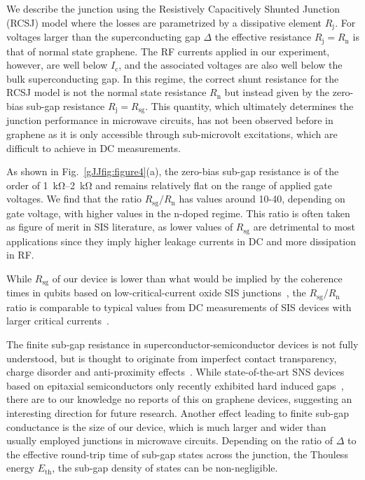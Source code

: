 We describe the junction using the Resistively Capacitively Shunted Junction (RCSJ) model where the losses are parametrized by a dissipative element $R_\text{j}$.
For voltages larger than the superconducting gap $\Delta$ the effective resistance $R_\text{j} = R_\text{n}$ is that of normal state graphene.
The RF currents applied in our experiment, however, are well below $I_\text{c}$, and the associated voltages are also well below the bulk superconducting gap.
In this regime, the correct shunt resistance for the RCSJ model is not the normal state resistance $R_\text{n}$ but instead given by the zero-bias sub-gap resistance $R_\text{j} = R_\text{sg}$.
This quantity, which ultimately determines the junction performance in microwave circuits, has not been observed before in graphene as it is only accessible through sub-microvolt excitations, which are difficult to achieve in DC measurements.

As shown in Fig.~\ref{gJJfig:figure4}(a), the zero-bias sub-gap resistance is of the order of \SIrange{1}{2}{\kilo\ohm} and remains relatively flat on the range of applied gate voltages.
We find that the ratio $R_\text{sg}/R_\text{n}$ has values around 10-40, depending on gate voltage, with higher values in the n-doped regime.
This ratio is often taken as figure of merit in SIS literature, as lower values of $R_\text{sg}$ are detrimental to most applications since they imply higher leakage currents in DC and more dissipation in RF.

While $R_\text{sg}$ of our device is lower than what would be implied by the coherence times in qubits based on low-critical-current oxide SIS junctions~\cite{paikObservationHighCoherence2011g}, the $R_\text{sg}/R_\text{n}$ ratio is comparable to typical values from DC measurements of SIS devices with larger critical currents~\cite{iosadCharacterizationFabricationProcess2002b,tolpygoSubgapLeakageNb2013}.

The finite sub-gap resistance in superconductor-semiconductor devices is not fully understood, but is thought to originate from imperfect contact transparency, charge disorder and anti-proximity effects~\cite{liuPhenomenologySoftGap2017a,bretheauTunnellingSpectroscopyAndreev2017a}.
While state-of-the-art SNS devices based on epitaxial semiconductors only recently exhibited hard induced gaps~\cite{changHardGapEpitaxial2015,kjaergaardQuantizedConductanceDoubling2016}, there are to our knowledge no reports of this on graphene devices, suggesting an interesting direction for future research.
Another effect leading to finite sub-gap conductance is the size of our device, which is much larger and wider than usually employed junctions in microwave circuits.
Depending on the ratio of $\Delta$ to the effective round-trip time of sub-gap states across the junction, the Thouless energy $E_\text{th}$, the sub-gap density of states can be non-negligible.

